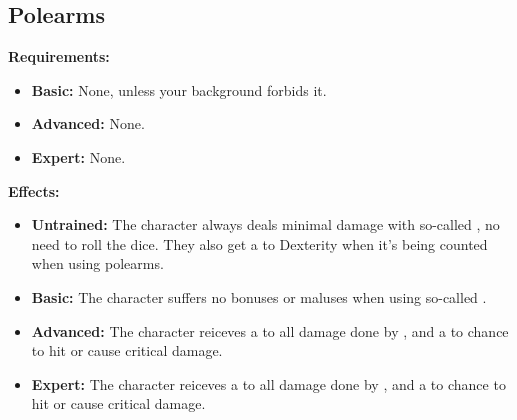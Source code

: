 \subsection{Polearms}
\begin{table}[!ht]
\centering
{}
\end{table}
\textbf{Requirements:}
\begin{itemize}
	\item \textbf{Basic:} None, unless your background forbids it.
	\item \textbf{Advanced:} None.
	\item \textbf{Expert:} None.
\end{itemize}
\textbf{Effects:}
\begin{itemize}
	\item \textbf{Untrained:} The character always deals minimal damage with so-called  , no need to roll the dice. They also get a  to Dexterity when it's being counted when using polearms.
	\item \textbf{Basic:} The character suffers no bonuses or maluses when using so-called  .
	\item \textbf{Advanced:} The character reiceves a  to all damage done by  , and a  to chance to hit or cause critical damage.
	\item \textbf{Expert:} The character reiceves a  to all damage done by  , and a  to chance to hit or cause critical damage.
\end{itemize}\newpage
